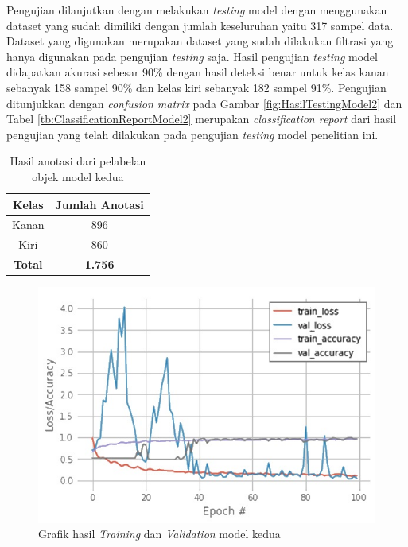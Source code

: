 Pengujian dilanjutkan dengan melakukan \emph{testing} model dengan menggunakan dataset yang sudah dimiliki dengan jumlah keseluruhan yaitu 317 sampel data. Dataset yang digunakan merupakan dataset yang sudah dilakukan filtrasi yang hanya digunakan pada pengujian \emph{testing} saja. Hasil pengujian \emph{testing} model didapatkan akurasi sebesar 90\% dengan hasil deteksi benar untuk kelas kanan sebanyak 158 sampel 90\% dan kelas kiri sebanyak 182 sampel 91\%. Pengujian ditunjukkan dengan \emph{confusion matrix} pada Gambar \ref{fig:HasilTestingModel2} dan Tabel \ref{tb:ClassificationReportModel2} merupakan \emph{classification report} dari hasil pengujian yang telah dilakukan pada pengujian \emph{testing} model penelitian ini.

\begin{longtable}{|c|c|}
  \caption{Hasil anotasi dari pelabelan objek model kedua}
  \label{tb:HasilAnotasi}  \\
  \hline
  \rowcolor[HTML]{C0C0C0}
  \textbf{Kelas} & \textbf{Jumlah Anotasi}  \\
  \hline
  Kanan           & 896    \\
  \hline
  Kiri            & 860    \\
  \hline
  \textbf{Total}  & \textbf{1.756}  \\
  \hline
\end{longtable}

\begin{figure}[H]
  \centering
  \includegraphics[scale=0.9]{gambar/belakang w.jpg}
  \caption{Grafik hasil \emph{Training} dan \emph{Validation} model kedua}
  \label{fig:HasilTrainingValidationModel2}
\end{figure}



